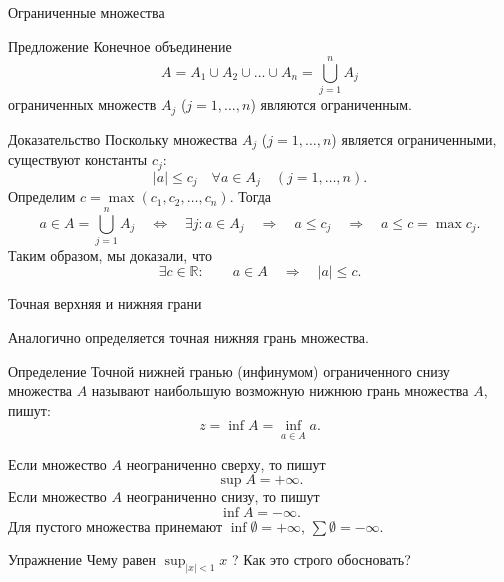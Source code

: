 \documentclass[8pt]{beamer}
\begin{document}
\begin{frame}{Ограниченные множества}
\begin{block}{Предложение}
Конечное объединение
$$A=A_1 \cup A_2 \cup \ldots \cup A_n=\bigcup_{j=1}^n A_j$$
ограниченных множеств $A_j$ ($j=1,\ldots,n$) являются ограниченным.
\end{block}
\begin{block}{Доказательство}
Поскольку множества $A_j$ ($j=1,\ldots,n$) является ограниченными, существуют константы $c_j$:
$$|a|\le c_j \quad \forall a\in A_j \quad (j=1,\ldots,n).$$
Определим $c=\max( c_1, c_2, \ldots, c_n )$. Тогда
$$
a\in A=\bigcup_{j=1}^n A_j \quad \Leftrightarrow \quad 
\exists j: a\in A_j \quad \Rightarrow \quad
a\le c_j \quad \Rightarrow \quad
a \le c=\max c_j.
$$
Таким образом, мы доказали, что
$$\exists c\in \mathbb{R}:\qquad  a\in A \quad \Rightarrow \quad |a|\le c.$$
\end{block}
\end{frame}


\begin{frame}{Точная верхняя и нижняя грани}

Аналогично определяется точная нижняя грань множества.

\begin{block}{Определение}
Точной нижней гранью (инфинумом) ограниченного снизу множества $A$ называют наибольшую возможную нижнюю грань множества $A$, пишут:
$$z=\inf A= \inf_{a\in A} a.$$
\end{block}
Если множество $A$ неограниченно сверху, то пишут
$$\sup A = +\infty.$$
Если множество $A$ неограниченно снизу, то пишут
$$\inf A = -\infty.$$
Для пустого множества принемают $\inf\emptyset = +\infty$, $\sum\emptyset = -\infty$.

\begin{block}{Упражнение}
Чему равен $\displaystyle \sup_{|x|<1} x$ ? Как это строго обосновать?
\end{block}

\end{frame}
\end{document}
